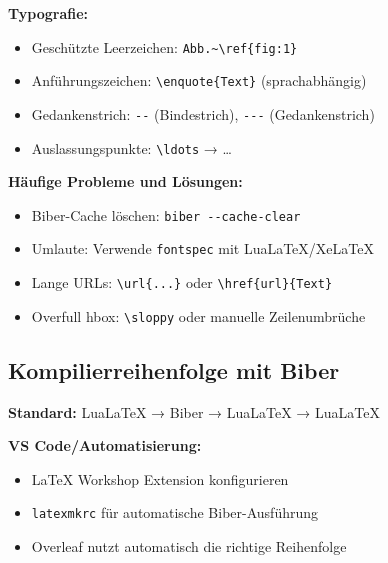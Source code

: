 \documentclass[11pt,a4paper]{article}
\begin{document}
    \textbf{Typografie:}
    \begin{itemize}
        \item Geschützte Leerzeichen: \verb|Abb.~\ref{fig:1}|
        \item Anführungszeichen: \verb|\enquote{Text}| (sprachabhängig)
        \item Gedankenstrich: \verb|--| (Bindestrich), \verb|---| (Gedankenstrich)
        \item Auslassungspunkte: \verb|\ldots| → …
    \end{itemize}

    \textbf{Häufige Probleme und Lösungen:}
    \begin{itemize}
        \item Biber-Cache löschen: \verb|biber --cache-clear|
        \item Umlaute: Verwende \verb|fontspec| mit LuaLaTeX/XeLaTeX
        \item Lange URLs: \verb|\url{...}| oder \verb|\href{url}{Text}|
        \item Overfull hbox: \verb|\sloppy| oder manuelle Zeilenumbrüche
    \end{itemize}

    \subsection*{Kompilierreihenfolge mit Biber}
    \textbf{Standard:} LuaLaTeX → Biber → LuaLaTeX → LuaLaTeX

    \textbf{VS Code/Automatisierung:}
    \begin{itemize}
        \item LaTeX Workshop Extension konfigurieren
        \item \verb|latexmkrc| für automatische Biber-Ausführung
        \item Overleaf nutzt automatisch die richtige Reihenfolge
    \end{itemize}


\end{document}
